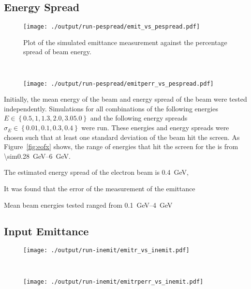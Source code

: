 \subsection{Energy Spread}

\begin{figure*}[!tb]
	\centering
	\begin{subfigure}[t]{\columnwidth}
		\texttt{[image: ./output/run-pespread/emit\_vs\_pespread.pdf]}
		\caption{
			Plot of the simulated emittance measurement against the percentage
			spread of beam energy.
		}
		\label{fig:emit_pespread}
	\end{subfigure}\hfill~
	\begin{subfigure}[t]{\columnwidth}
		\texttt{[image: ./output/run-pespread/emitperr\_vs\_pespread.pdf]}
		\caption{
		}
		\label{fig:emitperr_pespread}
	\end{subfigure}
\end{figure*}


Initially, the mean energy of the beam and energy spread of the beam were tested
independently. Simulations for all combinations of the following energies \(E
\in \left\{ 0.5, 1, 1.3, 2.0, 3.0 5.0\right\} \) and the following energy
spreads \(\sigma_E \in \left\{ 0.01, 0.1, 0.3, 0.4 \right\}\) were run.  These
energies and energy spreads were chosen such that at least one standard
deviation of the beam hit the screen. As Figure~\ref{fig:eofx} shows, the range
of energies that hit the screen for the is from
\SIrange{\sim0.28}{6}{\giga\electronvolt}.

The estimated energy spread of the electron beam is
\SI{0.4}{\giga\electronvolt}, 



It was found that the error of the measurement of the emittance 

Mean beam energies tested ranged from \SIrange{0.1}{4}{\giga\electronvolt}

\subsection{Input Emittance}

\begin{figure*}[!tb]
	\centering
	\begin{subfigure}[t]{\columnwidth}
		\centering
		\texttt{[image: ./output/run-inemit/emitr\_vs\_inemit.pdf]}
		\caption{
		}
		\label{fig:emitr_inemit}
	\end{subfigure}%
	~
	\begin{subfigure}[t]{\columnwidth}
		\centering
		\texttt{[image: ./output/run-inemit/emitrperr\_vs\_inemit.pdf]}
		\caption{
		}
		\label{fig:emitrperr_inemit}
	\end{subfigure}%
\end{figure*}

